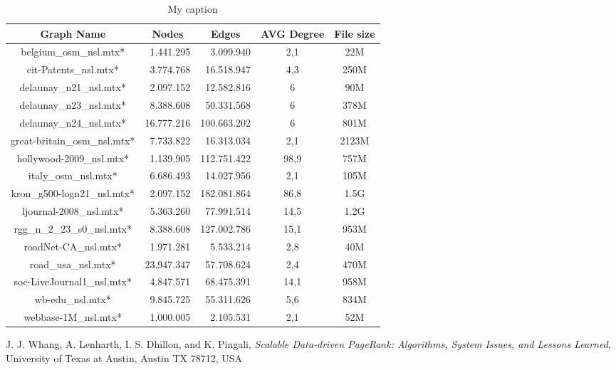 \documentclass[journal]{IEEEtran}
\begin{document}
\begin{table}[]
\centering
\setlength\tabcolsep{5pt}
\caption{My caption}
\label{my-label}
\begin{tabular}{|c|r|r|c|c|}
\hline
\multicolumn{1}{|c|}{\bfseries Graph Name} & 
\multicolumn{1}{|c|}{\bfseries Nodes} & 
\multicolumn{1}{|c|}{\bfseries Edges} & 
\multicolumn{1}{|c|}{\bfseries AVG Degree} & 
\multicolumn{1}{|c|}{\bfseries File size} \\
\hline
belgium\_osm\_nsl.mtx*       &  1.441.295  & 3.099.940   & 2,1        & 22M       \\
cit-Patents\_nsl.mtx*        &  3.774.768  & 16.518.947  & 4,3        & 250M      \\
delaunay\_n21\_nsl.mtx*      &  2.097.152  & 12.582.816  & 6          & 90M       \\
delaunay\_n23\_nsl.mtx*      &  8.388.608  & 50.331.568  & 6          & 378M      \\
delaunay\_n24\_nsl.mtx*      &  16.777.216 & 100.663.202 & 6          & 801M      \\
great-britain\_osm\_nsl.mtx* &  7.733.822  & 16.313.034  & 2,1        & 2123M     \\
hollywood-2009\_nsl.mtx*     &  1.139.905  & 112.751.422 & 98,9       & 757M      \\
italy\_osm\_nsl.mtx*         &  6.686.493  & 14.027.956  & 2,1        & 105M      \\
kron\_g500-logn21\_nsl.mtx*  &  2.097.152  & 182.081.864 & 86,8       & 1.5G      \\
ljournal-2008\_nsl.mtx*      &  5.363.260  & 77.991.514  & 14,5       & 1.2G      \\
rgg\_n\_2\_23\_s0\_nsl.mtx*  &  8.388.608  & 127.002.786 & 15,1       & 953M      \\
roadNet-CA\_nsl.mtx*         &  1.971.281  & 5.533.214   & 2,8        & 40M       \\
road\_usa\_nsl.mtx*          &  23.947.347 & 57.708.624  & 2,4        & 470M      \\
soc-LiveJournal1\_nsl.mtx*   &  4.847.571  & 68.475.391  & 14,1       & 958M      \\
wb-edu\_nsl.mtx*             &  9.845.725  & 55.311.626  & 5,6        & 834M      \\
webbase-1M\_nsl.mtx*         &  1.000.005  & 2.105.531   & 2,1        & 52M       \\
\hline
\end{tabular}
\end{table}

\begin{thebibliography}{1}

J. J. Whang, A. Lenharth, I. S. Dhillon, and K. Pingali, \emph{Scalable Data-driven PageRank: Algorithms, System Issues, and Lessons Learned}, University of Texas at Austin, Austin TX 78712, USA

\end{thebibliography}
\end{document}
